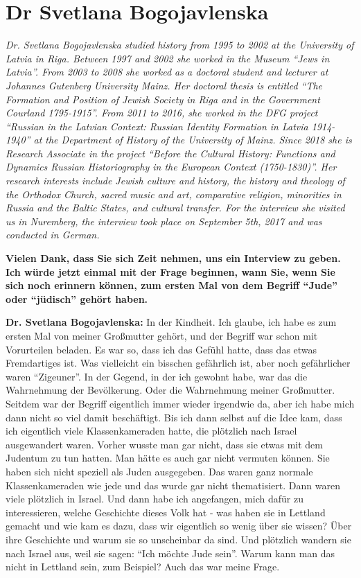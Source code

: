 \section{Dr Svetlana Bogojavlenska}

\textit{Dr. Svetlana Bogojavlenska studied history from 1995 to 2002 at the University of Latvia in Riga. Between 1997 and 2002 she worked in the Museum ``Jews in Latvia''. From 2003 to 2008 she worked as a doctoral student and lecturer at Johannes Gutenberg University Mainz. Her doctoral thesis is entitled ``The Formation and Position of Jewish Society in Riga and in the Government Courland 1795-1915''. From 2011 to 2016, she worked in the DFG project ``Russian in the Latvian Context: Russian Identity Formation in Latvia 1914-1940'' at the Department of History of the University of Mainz. Since 2018 she is Research Associate in the project ``Before the Cultural History: Functions and Dynamics Russian Historiography in the European Context (1750-1830)''. Her research interests include Jewish culture and history, the history and theology of the Orthodox Church, sacred music and art, comparative religion, minorities in Russia and the Baltic States, and cultural transfer.
For the interview she visited us in Nuremberg, the interview took place on September 5th, 2017 and was conducted in German.}\par
\vspace*{2em}
\textbf{Vielen Dank, dass Sie sich Zeit nehmen, uns ein Interview zu geben. Ich würde jetzt einmal mit der Frage beginnen, wann Sie, wenn Sie sich noch erinnern können, zum ersten Mal von dem Begriff "`Jude"' oder "`jüdisch"' gehört haben.}

\textbf{Dr. Svetlana Bogojavlenska:} In der Kindheit. Ich glaube, ich habe es zum ersten Mal von meiner Großmutter gehört, und der Begriff war schon mit Vorurteilen beladen. Es war so, dass ich das Gefühl hatte, dass das etwas Fremdartiges ist. Was vielleicht ein bisschen gefährlich ist, aber noch gefährlicher waren "`Zigeuner"'. In der Gegend, in der ich gewohnt habe, war das die Wahrnehmung der Bevölkerung. Oder die Wahrnehmung meiner Großmutter. Seitdem war der Begriff eigentlich immer wieder irgendwie da, aber ich habe mich dann nicht so viel damit beschäftigt. Bis ich dann selbst auf die Idee kam, dass ich eigentlich viele Klassenkameraden hatte, die plötzlich nach Israel ausgewandert waren.
Vorher wusste man gar nicht, dass sie etwas mit dem Judentum zu tun hatten. Man hätte es auch gar nicht vermuten können. Sie haben sich nicht speziell als Juden ausgegeben. Das waren ganz normale Klassenkameraden wie jede und das wurde gar nicht thematisiert. Dann waren viele plötzlich in Israel. Und dann habe ich angefangen, mich dafür zu interessieren, welche Geschichte dieses Volk hat - was haben sie in Lettland gemacht und wie kam es dazu, dass wir eigentlich so wenig über sie wissen? Über ihre Geschichte und warum sie so unscheinbar da sind. Und plötzlich wandern sie nach Israel aus, weil sie sagen: "`Ich möchte Jude sein"'. Warum kann man das nicht in Lettland sein, zum Beispiel? Auch das war meine Frage.


